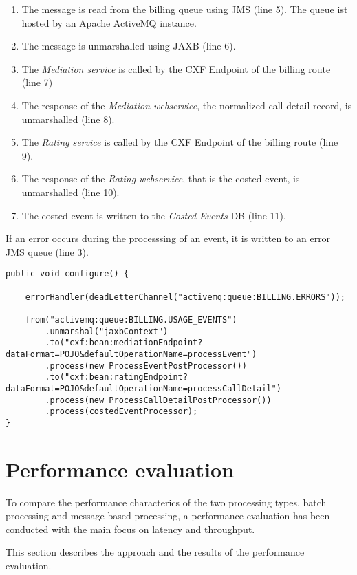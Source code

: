 \begin{enumerate}
	\item The message is read from the billing queue using \ac{JMS} (line 5). The queue ist hosted by an Apache ActiveMQ instance.
	\item The message is unmarshalled using \ac{JAXB} (line 6).
	\item The \emph{Mediation service} is called by the CXF Endpoint of the billing route (line 7)
	\item The response of the \emph{Mediation webservice}, the normalized call detail record, is unmarshalled (line 8). 
	\item The \emph{Rating service} is called by the CXF Endpoint of the billing route (line 9).
	\item The response of the \emph{Rating webservice}, that is the costed event, is unmarshalled (line 10).
	\item The costed event is written to the \emph{Costed Events} DB (line 11).
\end{enumerate}

If an error occurs during the processsing of an event, it is written to an error \ac{JMS} queue (line 3).

\begin{lstlisting}[caption={Billing route definition},label=listing:ch4_billing_route]
public void configure() {
		
	errorHandler(deadLetterChannel("activemq:queue:BILLING.ERRORS"));
	
	from("activemq:queue:BILLING.USAGE_EVENTS")
		.unmarshal("jaxbContext")
		.to("cxf:bean:mediationEndpoint?dataFormat=POJO&defaultOperationName=processEvent")
		.process(new ProcessEventPostProcessor())
		.to("cxf:bean:ratingEndpoint?dataFormat=POJO&defaultOperationName=processCallDetail")
		.process(new ProcessCallDetailPostProcessor())
		.process(costedEventProcessor);
}
\end{lstlisting}

\section{Performance evaluation}\label{sec:ch4_evaluation}
To compare the performance characterics of the two processing types, batch processing and message-based processing, a performance evaluation has been conducted with the main focus on latency and throughput.

This section describes the approach and the results of the performance evaluation.


